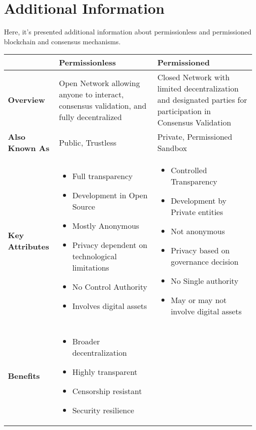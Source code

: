 \chapter{Additional Information} \label{add_info}

Here, it's presented additional information about permissionless and permissioned blockchain and consensus mechanisms.

\begin{table}[h]
\centering
\begin{tabular}{|l|p{5.5cm}|p{5.5cm}|}
\hline
 & \textbf{Permissionless} & \textbf{Permissioned} \\
\hline
\textbf{Overview} & Open Network allowing anyone to interact, consensus validation, and fully decentralized & Closed Network with limited decentralization and designated parties for participation in Consensus Validation \\
\hline
\textbf{Also Known As} & Public, Trustless & Private, Permissioned Sandbox \\
\hline
\textbf{Key Attributes} & 
\begin{itemize}
  \item Full transparency
  \item Development in Open Source
  \item Mostly Anonymous
  \item Privacy dependent on technological limitations
  \item No Control Authority
  \item Involves digital assets
\end{itemize} 
& 
\begin{itemize}
  \item Controlled Transparency
  \item Development by Private entities
  \item Not anonymous
  \item Privacy based on governance decision
  \item No Single authority
  \item May or may not involve digital assets
\end{itemize} \\
\hline
\textbf{Benefits} & 
\begin{itemize}
  \item Broader decentralization
  \item Highly transparent
  \item Censorship resistant
  \item Security resilience

\end{itemize}
\end{tabular}
\end{table}
